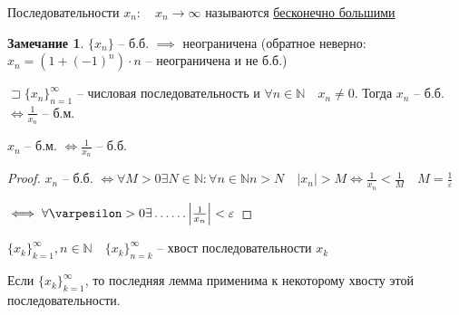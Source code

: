 \documentclass{book}
\newcommand\N{\ensuremath{\mathbb{N}}}
\theoremstyle{definition}
\newtheorem*{note}{Замечание}
\begin{document}
    \begin{definition}
        Последовательности $x_n:\quad x_n\to \infty $ называются \underline{бесконечно большими}
    \end{definition}
    \begin{note}
        $\{x_n\}$ -- б.б. $\implies $ неограничена (обратное неверно: $x_{n}  = (1+(-1)^n)\cdot n$ -- неограничена и не б.б.)
    \end{note}
    \begin{lemma}

        $\sqsupset  \{x_n\}_{n=1}^{\infty }$ -- числовая последовательность и $\forall n\in \N  \quad x_n\neq 0$. Тогда $x_{n} $ -- б.б. $\iff \frac{1}{x_{n} }$ -- б.м. 

        $x_{n} $ -- б.м. $\iff  \frac{1}{x_{n} }$ -- б.б.
    \end{lemma}
    \begin{proof}
        $x_{n} $ -- б.б. $\iff  \forall M>0 \exists  N\in \N : \forall n\in \N  n>N\quad |x_n| >M \iff \frac{1}{x_{n} }<\frac{1}{M}\quad M = \frac{1}{\varepsilon}$

        $\iff \forall \varpesilon >0 \exists \ldots\ldots \left| \frac{1}{x_{n} } \right| <\varepsilon$
    \end{proof}

    $\{x_k\}_{k=1}^{\infty }, n\in \N \quad \{x_k\}_{n=k}^{\infty }$ -- хвост последовательности $x_k$

    Если $\{x_k\}_{k=1}^{\infty }$, то последняя лемма применима к некоторому хвосту этой последовательности. 
\end{document}
